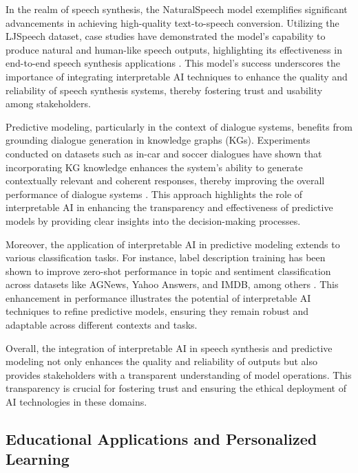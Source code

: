 In the realm of speech synthesis, the NaturalSpeech model exemplifies significant advancements in achieving high-quality text-to-speech conversion. Utilizing the LJSpeech dataset, case studies have demonstrated the model's capability to produce natural and human-like speech outputs, highlighting its effectiveness in end-to-end speech synthesis applications \cite{tan2022naturalspeechendtoendtextspeech}. This model's success underscores the importance of integrating interpretable AI techniques to enhance the quality and reliability of speech synthesis systems, thereby fostering trust and usability among stakeholders.



Predictive modeling, particularly in the context of dialogue systems, benefits from grounding dialogue generation in knowledge graphs (KGs). Experiments conducted on datasets such as in-car and soccer dialogues have shown that incorporating KG knowledge enhances the system's ability to generate contextually relevant and coherent responses, thereby improving the overall performance of dialogue systems \cite{chaudhuri2021groundingdialoguesystemsknowledge}. This approach highlights the role of interpretable AI in enhancing the transparency and effectiveness of predictive models by providing clear insights into the decision-making processes.



Moreover, the application of interpretable AI in predictive modeling extends to various classification tasks. For instance, label description training has been shown to improve zero-shot performance in topic and sentiment classification across datasets like AGNews, Yahoo Answers, and IMDB, among others \cite{gao2023benefitslabeldescriptiontrainingzeroshot}. This enhancement in performance illustrates the potential of interpretable AI techniques to refine predictive models, ensuring they remain robust and adaptable across different contexts and tasks.



Overall, the integration of interpretable AI in speech synthesis and predictive modeling not only enhances the quality and reliability of outputs but also provides stakeholders with a transparent understanding of model operations. This transparency is crucial for fostering trust and ensuring the ethical deployment of AI technologies in these domains.



\subsection{Educational Applications and Personalized Learning} \label{subsec:Educational Applications and Personalized Learning}



